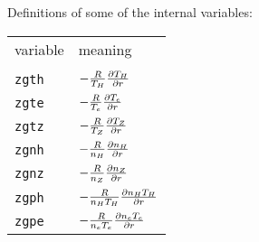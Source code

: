 Definitions of some of the internal variables:

\renewcommand{\arraystretch}{1.4}
\begin{center}
\begin{tabular}{lp{4.0in}}
variable & meaning \\
\\
{\tt zgth} & $ - \frac{R}{T_H} \frac{\partial T_H}{\partial r} $ \\
{\tt zgte} & $ - \frac{R}{T_e} \frac{\partial T_e}{\partial r} $ \\
{\tt zgtz} & $ - \frac{R}{T_Z} \frac{\partial T_Z}{\partial r} $ \\
{\tt zgnh} & $ - \frac{R}{n_H} \frac{\partial n_H}{\partial r} $ \\
{\tt zgnz} & $ - \frac{R}{n_Z} \frac{\partial n_Z}{\partial r} $ \\
{\tt zgph} & $ - \frac{R}{n_H T_H} \frac{\partial n_H T_H}{\partial r} $ \\
{\tt zgpe} & $ - \frac{R}{n_e T_e} \frac{\partial n_e T_e}{\partial r} $ \\
\end{tabular}  \end{center}

